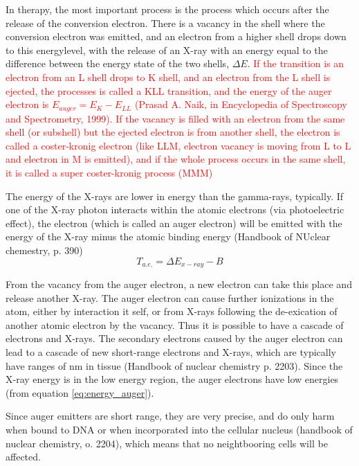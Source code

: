 \documentclass[a4paper,11pt,twoside]{book}
\begin{document}
\noindent 
In therapy, the most important process is the process which occurs after the release of the conversion electron. There is a vacancy in the shell where the conversion electron was emitted, and an electron from a higher shell drops down to this energylevel, with the release of an X-ray with an energy equal to the difference between the energy state of the two shells, $\Delta E$.\textcolor{red}{ If the transition is an electron from an L shell drops to K shell, and an electron from the L shell is ejected, the processes is called a KLL transition, and the energy of the auger electron is $E_{auger}=E_K - E_{LL}$ (Prasad A. Naik, in Encyclopedia of Spectroscopy and Spectrometry, 1999). If the vacancy is filled with an electron from the same shell (or subshell) but the ejected electron is from another shell, the electron is called a coster-kronig electron (like LLM, electron vacancy is moving from L to L and electron in M is emitted), and if the whole process occurs in the same shell, it is called a super coster-kronig process (MMM) }

The energy of the X-rays are lower in energy than the gamma-rays, typically. If one of the X-ray photon interacts within the atomic electrons (via photoelectric effect), the electron (which is called an auger electron) will be emitted with the energy of the X-ray minus the atomic binding energy  (Handbook of NUclear chemestry, p. 390)
\begin{equation} \label{eq:energy_auger}
    T_{a.e.}=\Delta E_{x-ray}-B
\end{equation}

From the vacancy from the auger electron, a new electron can take this place and release another X-ray. The auger electron can cause further ionizations in the atom, either by interaction it self, or from X-rays following the de-exication of another atomic electron by the vacancy. Thus it is possible to have a cascade of electrons and X-rays. The secondary electrons caused by the auger electron can lead to a cascade of new short-range electrons and X-rays, which are typically have ranges of nm in tissue (Handbook of nuclear chemistry p. 2203). Since the X-ray energy is in the low energy region, the auger electrons have low energies (from equation \ref{eq:energy_auger}).  

Since auger emitters are short range, they are very precise, and do only harm when bound to DNA or when incorporated into the cellular nucleus (handbook of nuclear chemistry, o. 2204), which means that no neightbooring cells will be affected. 
\end{document}
